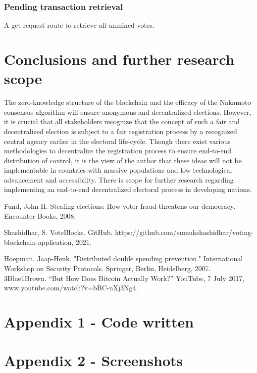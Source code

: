 \documentclass{article}
\begin{document}
    \subsubsection{Pending transaction retrieval}
    A get request route to retrieve all unmined votes.

    \section{Conclusions and further research scope}
    The zero-knowledge structure of the blockchain and the efficacy of the Nakamoto consensus algorithm will ensure anonymous and decentralized elections. However, it is crucial that all stakeholders recognize that the concept of such a fair and decentralized election is subject to a fair registration process by a recognized central agency earlier in the electoral life-cycle. Though there exist various methodologies to decentralize the registration process to ensure end-to-end distribution of control, it is the view of the author that these ideas will not be implementable in countries with massive populations and low technological advancement and accessibility. There is scope for further research regarding implementing an end-to-end decentralized electoral process in developing nations.

    \begin{thebibliography}{9}
        Fund, John H. Stealing elections: How voter fraud threatens our democracy. Encounter Books, 2008.
        
        Shashidhar, S. VoteBlocks. GitHub. https://github.com/sumukshashidhar/voting-blockchain-application, 2021.
        
        Hoepman, Jaap-Henk. "Distributed double spending prevention." International Workshop on Security Protocols. Springer, Berlin, Heidelberg, 2007.
        3Blue1Brown. “But How Does Bitcoin Actually Work?” YouTube, 7 July 2017, www.youtube.com/watch?v=bBC-nXj3Ng4.
    \end{thebibliography}
    \appendix
    \appendixpage
    \addappheadtotoc
    \section*{Appendix 1 - Code written}
    \section*{Appendix 2 - Screenshots}
\end{document}
